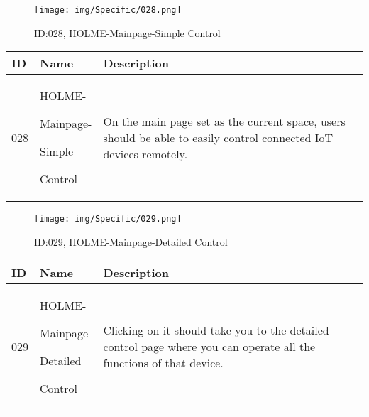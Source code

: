\documentclass[conference]{IEEEtran}
\begin{document}
\begin{enumerate}
\begin{figure}[h]
\centering
\texttt{[image: img/Specific/028.png]}
\caption{ID:028, HOLME-Mainpage-Simple Control}
\end{figure}
\begin{table}[h]
\def\arraystretch{1.2} \small
    \begin{tabular}{|p{1cm}|p{1.8cm}|p{5.0cm}|}
        \hline
        ID & Name & Description\\ \hline
         028 \par  & HOLME-\par Mainpage-\par Simple \par Control &
         On the main page set as the current space, users should be able to easily control connected IoT devices remotely.\\ \hline
    \end{tabular}
\end{table}

\begin{figure}[h]
\centering
\texttt{[image: img/Specific/029.png]}
\caption{ID:029, HOLME-Mainpage-Detailed Control}
\end{figure}
\begin{table}[h]
\def\arraystretch{1.2} \small
    \begin{tabular}{|p{1cm}|p{1.8cm}|p{5.0cm}|}
        \hline
        ID & Name & Description\\ \hline
         029 \par  & HOLME-\par Mainpage-\par Detailed \par Control &
         Clicking on it should take you to the detailed control page where you can operate all the functions of that device.\\ \hline
    \end{tabular}
\end{table}


\end{enumerate}
\end{document}
